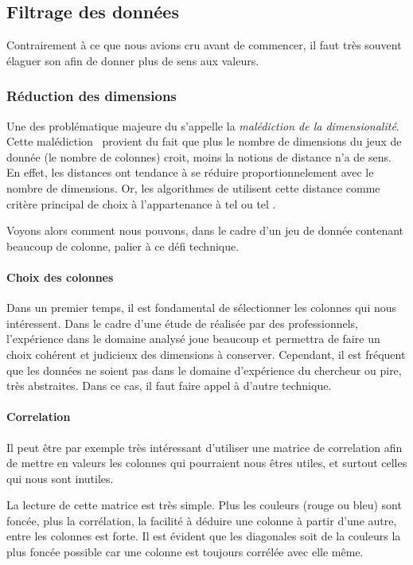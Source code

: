 \subsection{Filtrage des données}
Contrairement à ce que nous avions cru avant de commencer, il faut très souvent élaguer son  afin de donner plus de sens aux valeurs.

\subsubsection{Réduction des dimensions}
Une des problématique majeure du  s'appelle la \emph{malédiction de la dimensionalité}. Cette \og malédiction\fg~ provient du fait que plus le nombre de dimensions du jeux de donnée (\ie le nombre de colonnes) croit, moins la notions de distance n'a de sens. En effet, les distances ont tendance à se réduire proportionnelement avec le nombre de dimensions. Or, les algorithmes de  utilisent cette distance comme critère principal de choix à l'appartenance à tel ou tel .

Voyons alors comment nous pouvons, dans le cadre d'un jeu de donnée contenant beaucoup de colonne, palier à ce défi technique.
\paragraph{Choix des colonnes}
Dans un premier temps, il est fondamental de sélectionner les colonnes qui nous intéressent. Dans le cadre d'une étude de  réalisée par des professionnels, l'expérience dans le domaine analysé joue beaucoup et permettra de faire un choix cohérent et judicieux des dimensions à conserver. Cependant, il est fréquent que les données ne soient pas dans le domaine d'expérience du chercheur ou pire, très abstraites. Dans ce cas, il faut faire appel à d'autre technique.

\paragraph{Correlation}
Il peut être par exemple très intéressant d'utiliser une matrice de correlation afin de mettre en valeurs les colonnes qui pourraient nous êtres utiles, et surtout celles qui nous sont inutiles.

La lecture de cette matrice est très simple. Plus les couleurs (rouge ou bleu) sont foncée, plus la corrélation, \ie la facilité à déduire une colonne à partir d'une autre, entre les colonnes est forte. Il est évident que les diagonales soit de la couleurs la plus foncée possible car une colonne est toujours corrélée avec elle même.

